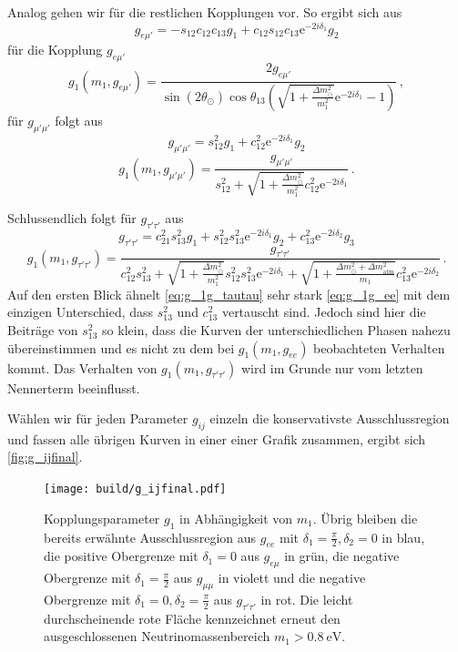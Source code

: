 Analog gehen wir für die restlichen Kopplungen vor.
So ergibt sich aus
\begin{equation*}
    g_{e \mu'} = -s_{12}c_{12}c_{13} g_1 + c_{12} s_{12} c_{13} \mathrm{e}^{-2 i \delta_1} g_2
\end{equation*}
für die Kopplung $g_{e \mu'}$
\begin{equation}
    g_1(m_1,g_{e \mu'}) = \frac{2 g_{e \mu'}}{\sin(2\theta_\odot) \cos\theta_{13} \left(\sqrt{1 + \frac{\Delta m^2_\odot}{m^2_1}} \mathrm{e}^{-2 i \delta_1} - 1\right)} \,,
    \label{eq:g_1g_emu}
\end{equation}
für $g_{\mu' \mu'}$ folgt aus
\begin{equation*}
    g_{\mu' \mu'} = s^2_{12} g_1 + c^2_{12} \mathrm{e}^{-2 i \delta_1} g_2
\end{equation*}
\begin{equation}
    g_1(m_1, g_{\mu'\mu'}) = \frac{g_{\mu'\mu'}}{s^2_{1 2} + \sqrt{1 + \frac{\Delta m^2_\odot}{m^2_1}} c^2_{12} \mathrm{e}^{-2 i \delta_1}} \,.
    \label{eq:g_1g_mumu}
\end{equation}

Schlussendlich folgt für $g_{\tau' \tau'}$ aus
\begin{equation*}
    g_{\tau' \tau'} = c^2_{21} s^2_{13} g_1 + s^2_{12}s^2_{13} \mathrm{e}^{-2 i \delta_1} g_2 + c^2_{13} \mathrm{e}^{-2 i \delta_2} g_3
\end{equation*}
\begin{equation}
    g_1(m_1,g_{\tau'\tau'}) = \frac{g_{\tau'\tau'}}{c^2_{12}s^2_{13} + \sqrt{1 + \frac{\Delta m^2_\odot}{m^2_1}} s^2_{12} s^2_{13} \mathrm{e}^{-2 i \delta_1} + \sqrt{1 + \frac{\Delta m^2_\odot + \Delta m^2_\text{atm}}{m_1}}c^2_{13} \mathrm{e}^{-2 i \delta_2}}\,.
    \label{eq:g_1g_tautau}
\end{equation}
Auf den ersten Blick ähnelt \eqref{eq:g_1g_tautau} sehr stark \eqref{eq:g_1g_ee} mit dem einzigen Unterschied, dass $s^2_{13}$ und $c^2_{13}$ vertauscht sind.
Jedoch sind hier die Beiträge von $s^2_{13}$ so klein, dass die Kurven der unterschiedlichen Phasen nahezu übereinstimmen und es nicht zu dem bei $g_1(m_1, g_{ee})$ beobachteten Verhalten kommt.
Das Verhalten von $g_1(m_1, g_{\tau'\tau'})$ wird im Grunde nur vom letzten Nennerterm beeinflusst.

Wählen wir für jeden Parameter $g_{ij}$ einzeln die konservativste Ausschlussregion und fassen alle übrigen Kurven in einer einer Grafik zusammen, ergibt sich \autoref{fig:g_ijfinal}.
\begin{figure}[H]
    \centering
    \texttt{[image: build/g\_ijfinal.pdf]}
    \caption{Kopplungsparameter $g_1$ in Abhängigkeit von $m_1$. Übrig bleiben die bereits erwähnte Ausschlussregion aus $g_{ee}$ mit $\delta_1=\frac{\pi}{2}, \delta_2=0$ in blau, 
    die positive Obergrenze mit $\delta_1 = 0$ aus $g_{e \mu}$ in grün, die negative Obergrenze mit $\delta_1 = \frac{\pi}{2}$ aus $g_{\mu\mu}$ in violett und die negative Obergrenze mit $\delta_1 = 0, \delta_2 = \frac{\pi}{2}$ aus $g_{\tau'\tau'}$ in rot.
    Die leicht durchscheinende rote Fläche kennzeichnet erneut den ausgeschlossenen Neutrinomassenbereich $m_1 > \SI{0.8}{\eV}$.}
    \label{fig:g_ijfinal}
\end{figure}

